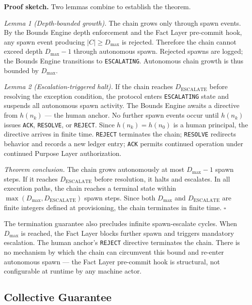 \medskip
\noindent\textbf{Proof sketch.} Two lemmas combine to establish the theorem.

\medskip
\textit{Lemma 1 (Depth-bounded growth).} The chain grows only through spawn events. By the Bounds Engine depth enforcement and the Fact Layer pre-commit hook, any spawn event producing $|C| \geq D_{\mathrm{max}}$ is rejected. Therefore the chain cannot exceed depth $D_{\mathrm{max}} - 1$ through autonomous spawn. Rejected spawns are logged; the Bounds Engine transitions to \texttt{ESCALATING}. Autonomous chain growth is thus bounded by $D_{\mathrm{max}}$.

\medskip
\textit{Lemma 2 (Escalation-triggered halt).} If the chain reaches $D_{\mathrm{ESCALATE}}$ before resolving the exception condition, the protocol enters \texttt{ESCALATING} state and suspends all autonomous spawn activity. The Bounds Engine awaits a directive from $h(n_k)$ — the human anchor. No further spawn events occur until $h(n_k)$ issues \texttt{ACK}, \texttt{RESOLVE}, or \texttt{REJECT}. Since $h(n_k) = h(n_0)$ is a human principal, the directive arrives in finite time. \texttt{REJECT} terminates the chain; \texttt{RESOLVE} redirects behavior and records a new ledger entry; \texttt{ACK} permits continued operation under continued Purpose Layer authorization.

\medskip
\textit{Theorem conclusion.} The chain grows autonomously at most $D_{\mathrm{max}} - 1$ spawn steps. If it reaches $D_{\mathrm{ESCALATE}}$ before resolution, it halts and escalates. In all execution paths, the chain reaches a terminal state within $\max(D_{\mathrm{max}}, D_{\mathrm{ESCALATE}})$ spawn steps. Since both $D_{\mathrm{max}}$ and $D_{\mathrm{ESCALATE}}$ are finite integers defined at provisioning, the chain terminates in finite time. $\square$

The termination guarantee also precludes infinite spawn-escalate cycles. When $D_{\mathrm{max}}$ is reached, the Fact Layer blocks further spawn and triggers mandatory escalation. The human anchor's \texttt{REJECT} directive terminates the chain. There is no mechanism by which the chain can circumvent this bound and re-enter autonomous spawn — the Fact Layer pre-commit hook is structural, not configurable at runtime by any machine actor.

\subsection{Collective Guarantee}
\label{sec:rs-collective-guarantee}

